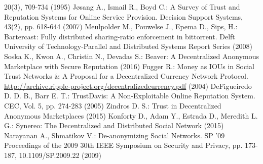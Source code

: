 \begin{thebibliography}{40}
   20(3), 709-734 (1995)
   J\o{}sang A., Ismail R., Boyd C.: A Survey of Trust and Reputation Systems for Online Service Provision. Decision
   Support Systems, 43(2), pp. 618-644 (2007)
   Meulpolder M., Pouwelse J., Epema D., Sips, H.: Bartercast: Fully distributed sharing-ratio enforcement in bittorrent.
   Delft University of Technology-Parallel and Distributed Systems Report Series (2008)
   Soska K., Kwon A., Christin N., Devadas S.: Beaver: A Decentralized Anonymous Marketplace with Secure Reputation (2016)
   Fugger R.: Money as IOUs in Social Trust Networks \& A Proposal for a Decentralized Currency Network Protocol.
   \url{http://archive.ripple-project.org/decentralizedcurrency.pdf} (2004)
   DeFigueiredo D. D. B., Barr E. T.: TrustDavis: A Non-Exploitable Online Reputation System. CEC, Vol. 5, pp. 274-283
   (2005)
   Zindros D. S.: Trust in Decentralized Anonymous Marketplaces (2015)
   Konforty D., Adam Y., Estrada D., Meredith L. G.: Synereo: The Decentralized and Distributed Social Network (2015)
   Narayanan A., Shmatikov V.: De-anonymizing Social Networks. SP '09 Proceedings of the 2009 30th IEEE Symposium on
   Security and Privacy, pp. 173-187, 10.1109/SP.2009.22 (2009)
\end{thebibliography}

